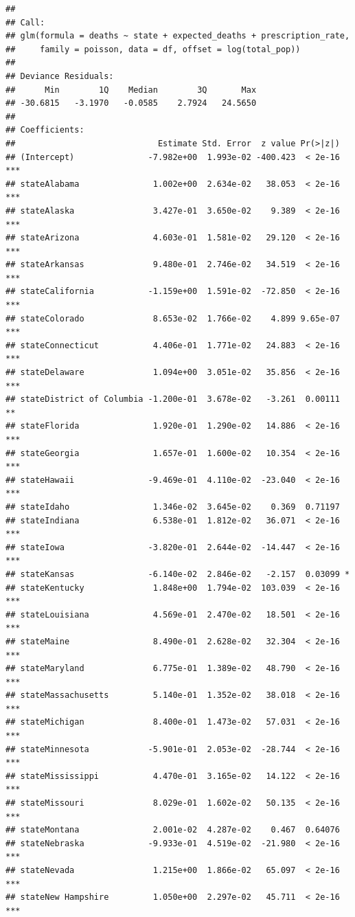 \documentclass[]{article}
\begin{document}
\begin{verbatim}
## 
## Call:
## glm(formula = deaths ~ state + expected_deaths + prescription_rate, 
##     family = poisson, data = df, offset = log(total_pop))
## 
## Deviance Residuals: 
##      Min        1Q    Median        3Q       Max  
## -30.6815   -3.1970   -0.0585    2.7924   24.5650  
## 
## Coefficients:
##                             Estimate Std. Error  z value Pr(>|z|)    
## (Intercept)               -7.982e+00  1.993e-02 -400.423  < 2e-16 ***
## stateAlabama               1.002e+00  2.634e-02   38.053  < 2e-16 ***
## stateAlaska                3.427e-01  3.650e-02    9.389  < 2e-16 ***
## stateArizona               4.603e-01  1.581e-02   29.120  < 2e-16 ***
## stateArkansas              9.480e-01  2.746e-02   34.519  < 2e-16 ***
## stateCalifornia           -1.159e+00  1.591e-02  -72.850  < 2e-16 ***
## stateColorado              8.653e-02  1.766e-02    4.899 9.65e-07 ***
## stateConnecticut           4.406e-01  1.771e-02   24.883  < 2e-16 ***
## stateDelaware              1.094e+00  3.051e-02   35.856  < 2e-16 ***
## stateDistrict of Columbia -1.200e-01  3.678e-02   -3.261  0.00111 ** 
## stateFlorida               1.920e-01  1.290e-02   14.886  < 2e-16 ***
## stateGeorgia               1.657e-01  1.600e-02   10.354  < 2e-16 ***
## stateHawaii               -9.469e-01  4.110e-02  -23.040  < 2e-16 ***
## stateIdaho                 1.346e-02  3.645e-02    0.369  0.71197    
## stateIndiana               6.538e-01  1.812e-02   36.071  < 2e-16 ***
## stateIowa                 -3.820e-01  2.644e-02  -14.447  < 2e-16 ***
## stateKansas               -6.140e-02  2.846e-02   -2.157  0.03099 *  
## stateKentucky              1.848e+00  1.794e-02  103.039  < 2e-16 ***
## stateLouisiana             4.569e-01  2.470e-02   18.501  < 2e-16 ***
## stateMaine                 8.490e-01  2.628e-02   32.304  < 2e-16 ***
## stateMaryland              6.775e-01  1.389e-02   48.790  < 2e-16 ***
## stateMassachusetts         5.140e-01  1.352e-02   38.018  < 2e-16 ***
## stateMichigan              8.400e-01  1.473e-02   57.031  < 2e-16 ***
## stateMinnesota            -5.901e-01  2.053e-02  -28.744  < 2e-16 ***
## stateMississippi           4.470e-01  3.165e-02   14.122  < 2e-16 ***
## stateMissouri              8.029e-01  1.602e-02   50.135  < 2e-16 ***
## stateMontana               2.001e-02  4.287e-02    0.467  0.64076    
## stateNebraska             -9.933e-01  4.519e-02  -21.980  < 2e-16 ***
## stateNevada                1.215e+00  1.866e-02   65.097  < 2e-16 ***
## stateNew Hampshire         1.050e+00  2.297e-02   45.711  < 2e-16 ***

\end{verbatim}
\end{document}
